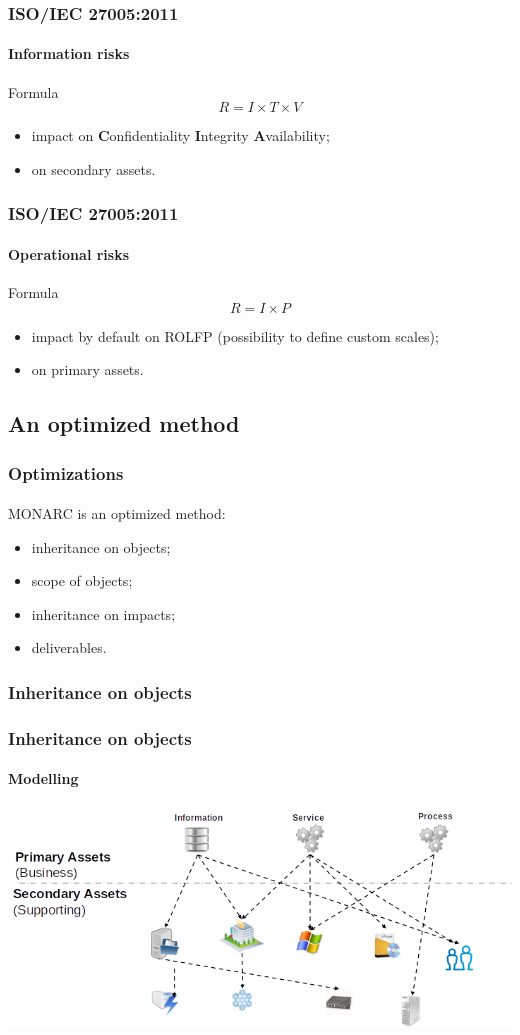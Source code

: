 \begin{frame}
  \frametitle{ISO/IEC 27005:2011}
  \framesubtitle{Information risks}
  \begin{block}{Formula}
    $$R = I \times T \times V$$
    \begin{itemize}
      \item impact on \textbf{C}onfidentiality \textbf{I}ntegrity \textbf{A}vailability;
      \item on secondary assets.
    \end{itemize}
  \end{block}
\end{frame}


\begin{frame}
  \frametitle{ISO/IEC 27005:2011}
  \framesubtitle{Operational risks}
  \begin{block}{Formula}
    $$R = I \times P$$
    \begin{itemize}
      \item impact by default on ROLFP (possibility to define custom scales);
      \item on primary assets.
    \end{itemize}
  \end{block}
\end{frame}


\subsection{An optimized method}
\begin{frame}
  \frametitle{Optimizations}
  \framesubtitle{}
  MONARC is an optimized method:
  \begin{itemize}
    \item inheritance on objects;
    \item scope of objects;
    \item inheritance on impacts;
    \item deliverables.
  \end{itemize}
\end{frame}

\subsubsection{Inheritance on objects}
\begin{frame}
  \frametitle{Inheritance on objects}
  \framesubtitle{Modelling}
  \begin{center}
    \includegraphics[scale=0.45]{../common_pictures/MONARC-method-modelling.png}
  \end{center}
\end{frame}

